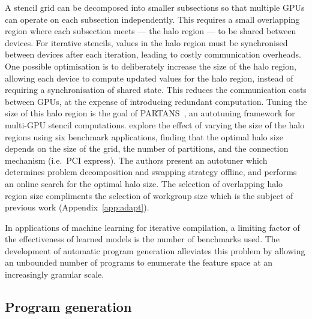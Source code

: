 A stencil grid can be decomposed into smaller subsections so that multiple GPUs can operate on each subsection independently. This requires a small overlapping region where each subsection meets --- the halo region --- to be shared between devices. For iterative stencils, values in the halo region must be synchronised between devices after each iteration, leading to costly communication overheads. One possible optimisation is to deliberately increase the size of the halo region, allowing each device to compute updated values for the halo region, instead of requiring a synchronisation of shared state. This reduces the communication costs between GPUs, at the expense of introducing redundant computation. Tuning the size of this halo region is the goal of PARTANS~\cite{Lutz2013}, an autotuning framework for multi-GPU stencil computations. \citeauthor{Lutz2013} explore the effect of varying the size of the halo regions using six benchmark applications, finding that the optimal halo size depends on the size of the grid, the number of partitions, and the connection mechanism (i.e.\ PCI express). The authors present an autotuner which determines problem decomposition and swapping strategy offline, and performs an online search for the optimal halo size. The selection of overlapping halo region size compliments the selection of workgroup size which is the subject of previous work (Appendix~\ref{app:adapt}).

In applications of machine learning for iterative compilation, a limiting factor of the effectiveness of learned models is the number of benchmarks used. The development of automatic program generation alleviates this problem by allowing an unbounded number of programs to enumerate the feature space at an increasingly granular scale.


\subsection{Program generation}

